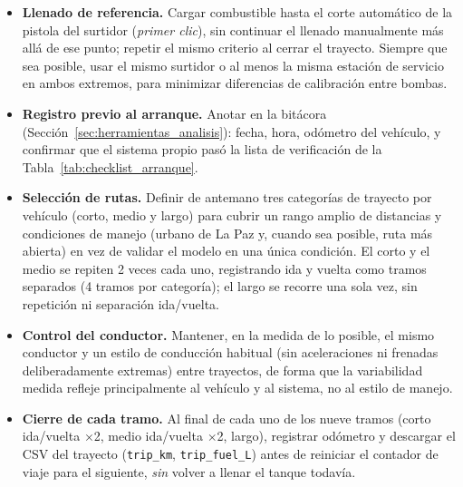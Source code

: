 \begin{itemize}
	\item \textbf{Llenado de referencia.} Cargar combustible hasta el corte automático de la pistola del surtidor (\textit{primer clic}), sin continuar el llenado manualmente más allá de ese punto; repetir el mismo criterio al cerrar el trayecto. Siempre que sea posible, usar el mismo surtidor o al menos la misma estación de servicio en ambos extremos, para minimizar diferencias de calibración entre bombas.
	\item \textbf{Registro previo al arranque.} Anotar en la bitácora (Sección~\ref{sec:herramientas_analisis}): fecha, hora, odómetro del vehículo, y confirmar que el sistema propio pasó la lista de verificación de la Tabla~\ref{tab:checklist_arranque}.
	\item \textbf{Selección de rutas.} Definir de antemano tres categorías de trayecto por vehículo (corto, medio y largo) para cubrir un rango amplio de distancias y condiciones de manejo (urbano de La Paz y, cuando sea posible, ruta más abierta) en vez de validar el modelo en una única condición. El corto y el medio se repiten 2 veces cada uno, registrando ida y vuelta como tramos separados (4 tramos por categoría); el largo se recorre una sola vez, sin repetición ni separación ida/vuelta.
	\item \textbf{Control del conductor.} Mantener, en la medida de lo posible, el mismo conductor y un estilo de conducción habitual (sin aceleraciones ni frenadas deliberadamente extremas) entre trayectos, de forma que la variabilidad medida refleje principalmente al vehículo y al sistema, no al estilo de manejo.
	\item \textbf{Cierre de cada tramo.} Al final de cada uno de los nueve tramos (corto ida/vuelta $\times$2, medio ida/vuelta $\times$2, largo), registrar odómetro y descargar el CSV del trayecto (\texttt{trip\_km}, \texttt{trip\_fuel\_L}) antes de reiniciar el contador de viaje para el siguiente, \emph{sin} volver a llenar el tanque todavía.
\end{itemize}

